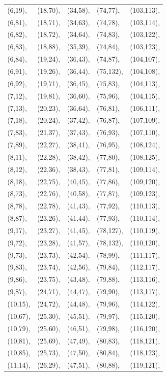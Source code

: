 \documentclass[a4,11pt]{article}
\begin{document}
\begin{center}
\begin{longtable}[p]{l l l l l}
(6,19),&(18,70),&(34,58),&(74,77),&(103,113),\\
(6,81),&(18,71),&(34,63),&(74,78),&(103,114),\\
(6,82),&(18,72),&(34,64),&(74,83),&(103,122),\\
(6,83),&(18,88),&(35,39),&(74,84),&(103,123),\\
(6,84),&(19,24),&(36,43),&(74,87),&(104,107),\\
(6,91),&(19,26),&(36,44),&(75,132),&(104,108),\\
(6,92),&(19,71),&(36,45),&(75,83),&(104,113),\\
(7,12),&(19,81),&(36,60),&(75,96),&(104,115),\\
(7,13),&(20,23),&(36,64),&(76,81),&(106,111),\\
(7,18),&(20,24),&(37,42),&(76,87),&(107,109),\\
(7,83),&(21,37),&(37,43),&(76,93),&(107,110),\\
(7,89),&(22,27),&(38,41),&(76,95),&(108,124),\\
(8,11),&(22,28),&(38,42),&(77,80),&(108,125),\\
(8,12),&(22,36),&(38,43),&(77,81),&(109,114),\\
(8,18),&(22,75),&(40,45),&(77,86),&(109,120),\\
(8,73),&(22,76),&(40,58),&(77,87),&(109,123),\\
(8,78),&(22,78),&(41,43),&(77,92),&(110,113),\\
(8,87),&(23,26),&(41,44),&(77,93),&(110,114),\\
(9,17),&(23,27),&(41,45),&(78,127),&(110,119),\\
(9,72),&(23,28),&(41,57),&(78,132),&(110,120),\\
(9,73),&(23,73),&(42,54),&(78,99),&(111,117),\\
(9,83),&(23,74),&(42,56),&(79,84),&(112,117),\\
(9,86),&(23,75),&(43,48),&(79,88),&(113,116),\\
(9,87),&(24,71),&(44,47),&(79,90),&(113,117),\\
(10,15),&(24,72),&(44,48),&(79,96),&(114,122),\\
(10,67),&(25,30),&(45,51),&(79,97),&(115,120),\\
(10,79),&(25,60),&(46,51),&(79,98),&(116,120),\\
(10,81),&(25,69),&(47,49),&(80,83),&(118,121),\\
(10,85),&(25,73),&(47,50),&(80,84),&(118,123),\\
(11,14),&(26,29),&(47,51),&(80,88),&(119,121),\\

\end{longtable}
\end{center}
\end{document}
